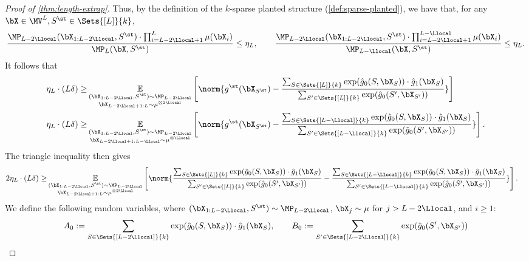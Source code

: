 \documentclass{article}
\begin{document}
\begin{proof}[Proof of \cref{thm:length-extrap}]
  Thus, by the definition of the $k$-sparse planted structure (\cref{def:sparse-planted}), %
  we have that, for any $\bX \in \MV^L, S^\st \in \Sets{[L]}{k}$, 
  \begin{align}
\frac{\MP_{L-2\Llocal}(\bX_{1:L-2\Llocal}, S^\st) \cdot \prod_{i=L-2\Llocal+1}^L \mu(\bX_i)}{\MP_L(\bX, S^\st)} \leq \eta_L, \qquad \frac{\MP_{L-2\Llocal}(\bX_{1:L-2\Llocal}, S^\st) \cdot \prod_{i=L-2\Llocal+1}^{L-\Llocal} \mu(\bX_i)}{\MP_{L-\Llocal}(\bX, S^\st)} \leq \eta_L\nonumber.
  \end{align}
  It follows that
  \begin{align}
    \eta_L \cdot (L\delta) \geq & \E_{\substack{(\bX_{1:L-2\Llocal}, S^\st) \sim \MP_{L-2\Llocal} \\ \bX_{L-2\Llocal+1:L} \sim \mu^{\otimes 2\Llocal}}} \left[\norm{ g^\st(\bX_{S^\st}) - \frac{ \sum_{S \in \Sets{[L]}{k}}\exp(\hat g_0(S, \bX_S)) \cdot \hat g_1(\bX_S)}{\sum_{S' \in \Sets{[L]}{k}} \exp(\hat g_0(S', \bX_{S'}))} } \right] \label{eq:L2L-sstar}\\
    \eta_L \cdot (L \delta) \geq & \E_{\substack{(\bX_{1:L-2\Llocal}, S^\st) \sim \MP_{L-2\Llocal} \\ \bX_{L-2\Llocal+1:L-\Llocal} \sim \mu^{\otimes \Llocal}}} \left[\norm{ g^\st(\bX_{S^\st}) -  \frac{\sum_{S \in \Sets{[L-\Llocal]}{k}}\exp(\hat g_0(S, \bX_S)) \cdot \hat g_1(\bX_S)}{\sum_{S' \in \Sets{[L-\Llocal]}{k}} \exp(\hat g_0(S', \bX_{S'}))} } \right] \label{eq:ll-sstar}.
  \end{align}
  The triangle inequality then gives
  \begin{align}
2\eta_L \cdot  (L \delta) \geq & \E_{\substack{(\bX_{1:L-2\Llocal}, S^\st) \sim \MP_{L-2\Llocal} \\ \bX_{L-2\Llocal+1:L} \sim \mu^{\otimes 2\Llocal}}} \left[\norm{ \frac{\sum_{S \in \Sets{[L]}{k}}\exp(\hat g_0(S, \bX_S)) \cdot \hat g_1(\bX_S)}{\sum_{S' \in \Sets{[L]}{k}} \exp(\hat g_0(S', \bX_{S'}))}  -  \frac{\sum_{S \in \Sets{[L-\Llocal]}{k}}\exp(\hat g_0(S, \bX_S)) \cdot \hat g_1(\bX_S)}{\sum_{S' \in \Sets{[L-\Llocal]}{k}} \exp(\hat g_0(S', \bX_{S'}))} } \right]\label{eq:l-triangle}. 
  \end{align}
  We define the following random variables, where  $(\bX_{1:L-2\Llocal}, S^\st) \sim \MP_{L-2\Llocal}$, $\bX_j \sim \mu$ for $j > L-2\Llocal$, and $i \geq 1$: 
  \begin{align}
    A_0  := \sum_{S \in \Sets{[L-2\Llocal]}{k}} {\exp(\hat g_0(S, \bX_S)) \cdot \hat g_1(\bX_S)}, \qquad B_0 := \sum_{S' \in \Sets{[L-2\Llocal]}{k}} \exp(\hat g_0(S', \bX_{S'}))\nonumber\\

\end{align}
\end{proof}
\end{document}
